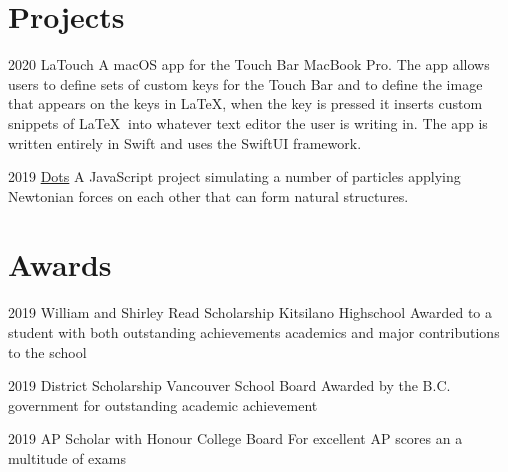 \documentclass[]{style}
\begin{document}
\section{Projects}

\begin{entrylist}


\entry
{2020}
{LaTouch}
{}
{A macOS app for the Touch Bar MacBook Pro. The app allows users to define sets of custom keys for the Touch Bar and to define the image that appears on the keys in \LaTeX, when the key is pressed it inserts custom snippets of \LaTeX $\:$ into whatever text editor the user is writing in. The app is written entirely in Swift and uses the SwiftUI framework.}


\entry
{2019}
{\href{https://sachagoldman.com/dots/}{Dots}}
{}
{A JavaScript project simulating a number of particles applying Newtonian forces on each other that can form natural structures.}


\end{entrylist}



\section{Awards}

\begin{entrylist}


\entry
{2019}
{William and Shirley Read Scholarship}
{Kitsilano Highschool}
{Awarded to a student with both outstanding achievements academics and major contributions to the school}


\entry
{2019}
{District Scholarship}
{Vancouver School Board}
{Awarded by the B.C. government for outstanding academic achievement}

\entry
{2019}
{AP Scholar with Honour}
{College Board}
{For excellent AP scores an a multitude of exams}


\end{entrylist}
\end{document}

